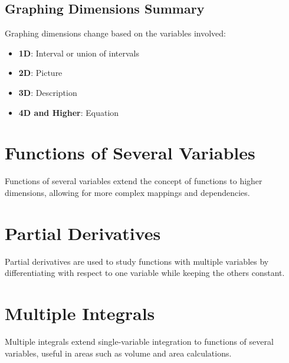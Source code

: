 \documentclass[a4paper,12pt,openany]{book}
\begin{document}
\section{Graphing Dimensions Summary}

Graphing dimensions change based on the variables involved:
\begin{itemize}
    \item \textbf{1D}: Interval or union of intervals
    \item \textbf{2D}: Picture
    \item \textbf{3D}: Description
    \item \textbf{4D and Higher}: Equation
\end{itemize}

\chapter{Functions of Several Variables}
Functions of several variables extend the concept of functions to higher dimensions, allowing for more complex mappings and dependencies.


\chapter{Partial Derivatives}
Partial derivatives are used to study functions with multiple variables by differentiating with respect to one variable while keeping the others constant.


\chapter{Multiple Integrals}
Multiple integrals extend single-variable integration to functions of several variables, useful in areas such as volume and area calculations.

\end{document}
